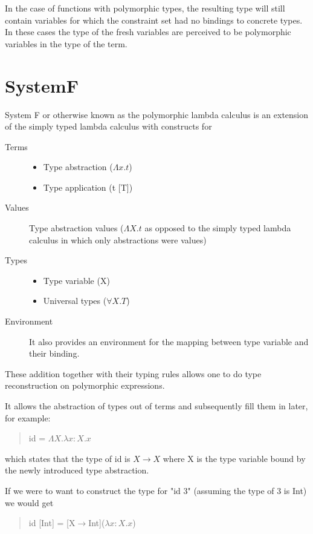 In the case of functions with polymorphic types, the resulting type will still contain variables for which the constraint set had no bindings to concrete types. In these cases the type of the fresh variables are perceived to be polymorphic variables in the type of the term.

\section{SystemF}
System F or otherwise known as the polymorphic lambda calculus is an extension of the simply typed lambda calculus with constructs for

\begin{description}
\item[Terms]{ \begin{itemize}
				 \item Type abstraction ($\Lambda x.t$)
				 \item Type application (t [T])
				 \end{itemize}
}
\item[Values] Type abstraction values ($\Lambda X.t$ as opposed to the simply typed lambda calculus in which only abstractions were values)
\item[Types]{ \begin{itemize}
				 \item Type variable (X)
				 \item Universal types ($\forall X. T$)
				 \end{itemize}
}
\item[Environment] It also provides an environment for the mapping between type variable and their binding.
\end{description}

These addition together with their typing rules allows one to do type reconstruction on polymorphic expressions.

It allows the abstraction of types out of terms and subsequently fill them in later, for example:
\begin{quotation}
id = $\Lambda X.\lambda x:X. x$
\end{quotation}
which states that the type of id is $X \rightarrow X$ where X is the type variable bound by the newly introduced type abstraction. 

If we were to want to construct the type for "id 3" (assuming the type of 3 is Int) we would get

\begin{quotation}
id [Int] = [X$\rightarrow$Int]($\lambda x:X. x$)
\end{quotation}

